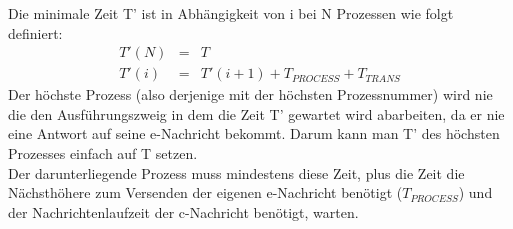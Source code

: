 Die minimale Zeit T' ist in Abhängigkeit von i bei N Prozessen wie folgt definiert:
\begin{eqnarray*}
  T'(N) & = & T \\
  T'(i) & = & T'(i+1) + T_{PROCESS} + T_{TRANS}
\end{eqnarray*}
Der höchste Prozess (also derjenige mit der höchsten Prozessnummer) wird nie die
den Ausführungszweig in dem die Zeit T' gewartet wird abarbeiten, da er nie eine
Antwort auf seine e-Nachricht bekommt. Darum kann man T' des höchsten Prozesses
einfach auf T setzen. \\
Der darunterliegende Prozess muss mindestens diese Zeit, plus die Zeit die
Nächsthöhere zum Versenden der eigenen e-Nachricht benötigt ($T_{PROCESS}$) und
der Nachrichtenlaufzeit der c-Nachricht benötigt, warten.
